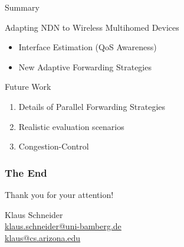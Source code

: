 \begin{frame}{Summary}
	\vspace*{-2em}
	\begin{block}{Adapting NDN to Wireless Multihomed Devices}
		\begin{itemize}
			\item Interface Estimation (QoS Awareness)
			\item New Adaptive Forwarding Strategies
		\end{itemize}
	\end{block}
	\begin{block}{Future Work}
		\begin{enumerate}
			\item Details of Parallel Forwarding Strategies
			\item Realistic evaluation scenarios
			\item Congestion-Control
		\end{enumerate}
	\end{block}
	\vspace*{.5em}
\end{frame}


\begin{frame}
	\frametitle{The End}
	\vspace{2cm}
	{\huge Thank you for
		your attention!
	}
	\vspace{2cm}  
	\begin{flushright}  
		Klaus Schneider \\ \footnotesize{\href{mailto:klaus.schneider@uni-bamberg.de}{klaus.schneider@uni-bamberg.de\\
		klaus@cs.arizona.edu}}
	\end{flushright}
\end{frame}

